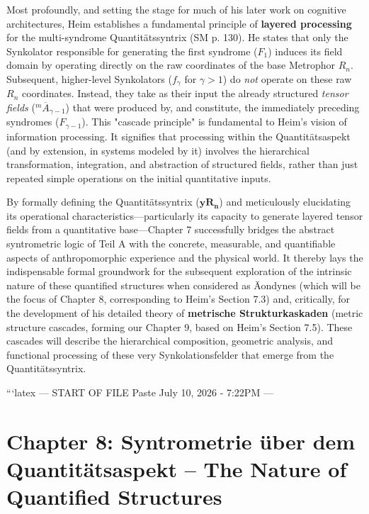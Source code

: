 \documentclass[12pt]{article}
\newcommand{\syndrom}{F} %
\newcommand{\quantitaetssyntrix}{\bm{yR_n}}
\begin{document}
Most profoundly, and setting the stage for much of his later work on cognitive architectures, Heim establishes a fundamental principle of \textbf{layered processing} for the multi-syndrome Quantitätssyntrix (SM p. 130). He states that only the Synkolator responsible for generating the first syndrome (\( \syndrom_1 \)) induces its field domain by operating directly on the raw coordinates of the base Metrophor \( R_n \). Subsequent, higher-level Synkolators (\( f_\gamma \) for \( \gamma > 1 \)) do \textit{not} operate on these raw \( R_n \) coordinates. Instead, they take as their input the already structured \textit{tensor fields} (\( ^m\overline{A}_{\gamma-1} \)) that were produced by, and constitute, the immediately preceding syndromes (\( \syndrom_{\gamma-1} \)). This "cascade principle" is fundamental to Heim's vision of information processing. It signifies that processing within the Quantitätsaspekt (and by extension, in systems modeled by it) involves the hierarchical transformation, integration, and abstraction of structured fields, rather than just repeated simple operations on the initial quantitative inputs.

By formally defining the Quantitätssyntrix (\(\quantitaetssyntrix\)) and meticulously elucidating its operational characteristics—particularly its capacity to generate layered tensor fields from a quantitative base—Chapter 7 successfully bridges the abstract syntrometric logic of Teil A with the concrete, measurable, and quantifiable aspects of anthropomorphic experience and the physical world. It thereby lays the indispensable formal groundwork for the subsequent exploration of the intrinsic nature of these quantified structures when considered as Äondynes (which will be the focus of Chapter 8, corresponding to Heim's Section 7.3) and, critically, for the development of his detailed theory of \textbf{metrische Strukturkaskaden} (metric structure cascades, forming our Chapter 9, based on Heim's Section 7.5). These cascades will describe the hierarchical composition, geometric analysis, and functional processing of these very Synkolationsfelder that emerge from the Quantitätssyntrix.

\clearpage 
```latex
--- START OF FILE Paste July 10, 2026 - 7:22PM ---

\section{Chapter 8: Syntrometrie über dem Quantitätsaspekt – The Nature of Quantified Structures}
\label{sec:chapter8}
\end{document}
